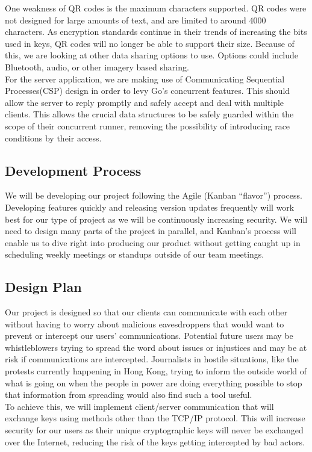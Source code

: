 \documentclass[11pt]{article}
\begin{document}
One weakness of QR codes is the maximum characters supported. QR codes were not designed for large amounts of text, and are limited to around 4000 characters. As encryption standards continue in their trends of increasing the bits used in keys, QR codes will no longer be able to support their size. Because of this, we are looking at other data sharing options to use. Options could include Bluetooth, audio, or other imagery based sharing.\\

For the server application, we are making use of Communicating Sequential Processes(CSP) design in order to levy Go’s concurrent features. This should allow the server to reply promptly and safely accept and deal with multiple clients. This allows the crucial data structures to be safely guarded within the scope of their concurrent runner, removing the possibility of introducing race conditions by their access.

\subsection{Development Process}
We will be developing our project following the Agile (Kanban “flavor”) process. Developing features quickly and releasing version updates frequently will work best for our type of project as we will be continuously increasing security. We will need to design many parts of the project in parallel, and Kanban’s process will enable us to dive right into producing our product without getting caught up in scheduling weekly meetings or standups outside of our team meetings.


\subsection{Design Plan}
Our project is designed so that our clients can communicate with each other without having to worry about malicious eavesdroppers that would want to prevent or intercept our users’ communications. Potential future users may be whistleblowers trying to spread the word about issues or injustices and may be at risk if communications are intercepted. Journalists in hostile situations, like the protests currently happening in Hong Kong, trying to inform the outside world of what is going on when the people in power are doing everything possible to stop that information from spreading would also find such a tool useful. \\

To achieve this, we will implement client/server communication that will exchange keys using methods other than the TCP/IP protocol. This will increase security for our users as their unique cryptographic keys will never be exchanged over the Internet, reducing the risk of the keys getting intercepted by bad actors. \\
\end{document}
